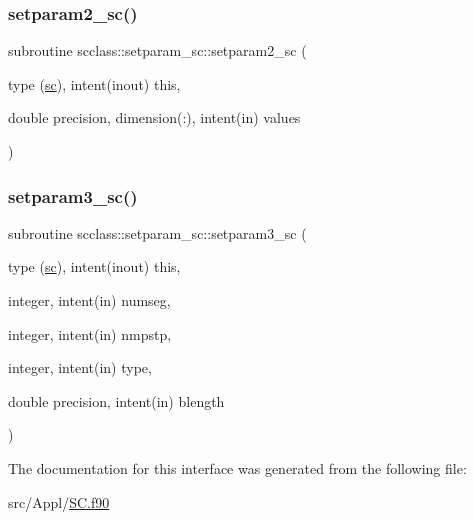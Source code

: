 \mbox{\label{interfacescclass_1_1setparam__sc_aaebddb22b2a1cb5da8e56c1ecae9e6f0}} 
\subsubsection{\texorpdfstring{setparam2\_sc()}{setparam2\_sc()}}
{\footnotesize\ttfamily subroutine scclass\+::setparam\+\_\+sc\+::setparam2\+\_\+sc (\begin{DoxyParamCaption}\item[{type (\mbox{\hyperlink{namespacescclass_structscclass_1_1sc}{sc}}), intent(inout)}]{this,  }\item[{double precision, dimension(\+:), intent(in)}]{values }\end{DoxyParamCaption})}

\mbox{\label{interfacescclass_1_1setparam__sc_a5bc1451fdabb3a886b7335be9f8ab8e3}} 
\subsubsection{\texorpdfstring{setparam3\_sc()}{setparam3\_sc()}}
{\footnotesize\ttfamily subroutine scclass\+::setparam\+\_\+sc\+::setparam3\+\_\+sc (\begin{DoxyParamCaption}\item[{type (\mbox{\hyperlink{namespacescclass_structscclass_1_1sc}{sc}}), intent(inout)}]{this,  }\item[{integer, intent(in)}]{numseg,  }\item[{integer, intent(in)}]{nmpstp,  }\item[{integer, intent(in)}]{type,  }\item[{double precision, intent(in)}]{blength }\end{DoxyParamCaption})}



The documentation for this interface was generated from the following file\+:\begin{DoxyCompactItemize}
\item 
src/\+Appl/\mbox{\hyperlink{_s_c_8f90}{S\+C.\+f90}}\end{DoxyCompactItemize}
